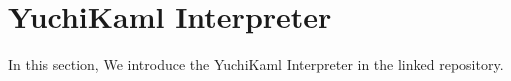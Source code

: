 \section{YuchiKaml Interpreter}
In this section, We introduce the YuchiKaml Interpreter in the linked repository.



